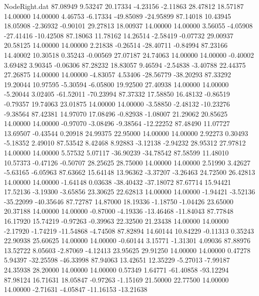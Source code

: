 \begin{filecontents}{NodeRight.dat}
  87.08949    9.53247   20.17334    -4.23156   -2.11863   28.47812   18.57187   14.00000   14.00000    4.46753   -6.17334  -49.85089  -24.95899
  87.14018   10.43945   18.05908    -2.36932   -0.90101   29.27813   18.00937   14.00000   14.00000    3.56055   -4.05908  -27.41416  -10.42508
  87.18063   11.78162   14.26514    -2.58419   -0.07732   29.00937   20.58125   14.00000   14.00000    2.21838   -0.26514  -28.40711   -0.84994
  87.23166   14.40002   10.30518     0.35243   -0.00569   27.07187   24.74063   14.00000   14.00000   -0.40002    3.69482    3.90345   -0.06306
  87.28232   18.83057    9.46594    -2.54838   -3.40788   22.44375   27.26875   14.00000   14.00000   -4.83057    4.53406  -28.56779  -38.20293
  87.33292   19.20044   10.97595    -5.30594   -6.05800   19.92500   27.40938   14.00000   14.00000   -5.20044    3.02405  -61.52011  -70.23994
  87.37332   17.58850   16.48132    -0.86519   -0.79357   19.74063   23.01875   14.00000   14.00000   -3.58850   -2.48132  -10.23276   -9.38564
  87.42381   14.97070   17.08496    -0.82938   -1.08007   21.29062   20.85625   14.00000   14.00000   -0.97070   -3.08496   -9.38564  -12.22252
  87.48490   11.07727   13.69507    -0.43544    0.20918   24.99375   22.95000   14.00000   14.00000    2.92273    0.30493   -5.18352    2.49010
  87.53542    8.42468    8.92883    -3.12138   -2.94232   28.95312   27.97812   14.00000   14.00000    5.57532    5.07117  -36.90239  -34.78542
  87.58599   11.48010   10.57373    -0.47126   -0.50707   28.25625   28.75000   14.00000   14.00000    2.51990    3.42627   -5.63165   -6.05963
  87.63662   15.64148   13.96362    -3.37207   -3.26463   24.72500   26.42813   14.00000   14.00000   -1.64148    0.03638  -38.40432  -37.18072
  87.67714   15.94421   17.52136    -3.19300   -3.65856   23.30625   22.62813   14.00000   14.00000   -1.94421   -3.52136  -35.22099  -40.35646
  87.72787   14.87000   18.19336    -1.18750   -1.04426   23.65000   20.37188   14.00000   14.00000   -0.87000   -4.19336  -13.46468  -11.84043
  87.77848   16.17920   15.74219    -0.97263   -0.39963   22.32500   21.23438   14.00000   14.00000   -2.17920   -1.74219  -11.54868   -4.74508
  87.82894   14.60144   10.84229    -0.11313    0.35243   22.90938   25.60625   14.00000   14.00000   -0.60144    3.15771   -1.31301    4.09036
  87.88976   13.52722    8.05603    -2.87069   -4.12413   23.95625   29.91250   14.00000   14.00000    0.47278    5.94397  -32.25598  -46.33998
  87.94063   13.42651   12.35229    -5.27013   -7.99187   24.35938   28.20000   14.00000   14.00000    0.57349    1.64771  -61.40858  -93.12294
  87.98124   16.71631   18.05847    -0.97263   -1.15169   21.50000   22.77500   14.00000   14.00000   -2.71631   -4.05847  -11.16153  -13.21638

\end{filecontents}
